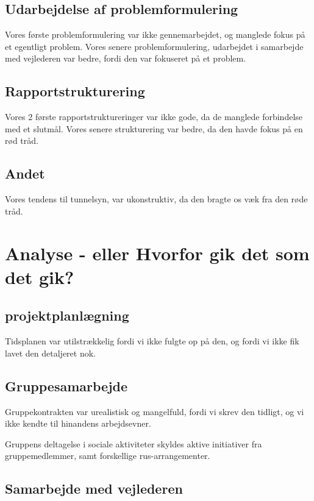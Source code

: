 \subsection{Udarbejdelse af problemformulering}

Vores første problemformulering var ikke gennemarbejdet, og manglede fokus på et egentligt problem. Vores senere problemformulering, udarbejdet i samarbejde med vejlederen var bedre, fordi den var fokuseret på et problem.

\subsection{Rapportstrukturering}

Vores 2 første rapportstruktureringer var ikke gode, da de manglede forbindelse med et slutmål. Vores senere strukturering var bedre, da den havde fokus på en rød tråd.

\subsection{Andet}

Vores tendens til tunnelsyn, var ukonstruktiv, da den bragte os væk fra den røde tråd.


\section{Analyse - eller Hvorfor gik det som det gik?}


\subsection{projektplanlægning}

Tidsplanen var utilstrækkelig fordi vi ikke fulgte op på den, og fordi vi ikke fik lavet den detaljeret nok.

\subsection{Gruppesamarbejde}

Gruppekontrakten var urealistisk og mangelfuld, fordi vi skrev den tidligt, og vi ikke kendte til hinandens arbejdsevner.

Gruppens deltagelse i sociale aktiviteter skyldes aktive initiativer fra gruppemedlemmer, samt forskellige rus-arrangementer.

\subsection{Samarbejde med vejlederen}

